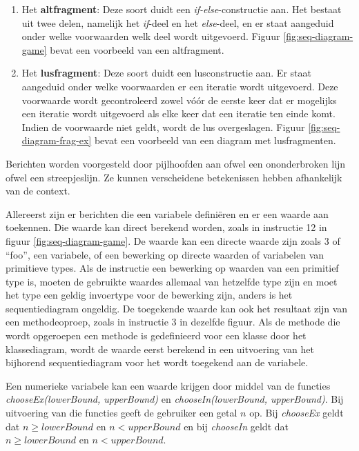 \begin{enumerate}
	\item Het \textbf{altfragment}: Deze soort duidt een \textit{if-else}-constructie aan. Het bestaat uit twee delen, namelijk het \textit{if}-deel en het \textit{else}-deel, en er staat aangeduid onder welke voorwaarden welk deel wordt uitgevoerd. Figuur \ref{fig:seq-diagram-game} bevat een voorbeeld van een altfragment.
	\item Het \textbf{lusfragment}: Deze soort duidt een lusconstructie aan. Er staat aangeduid onder welke voorwaarden er een iteratie wordt uitgevoerd. Deze voorwaarde wordt gecontroleerd zowel v\'o\'or de eerste keer dat er mogelijks een iteratie wordt uitgevoerd als elke keer dat een iteratie ten einde komt. Indien de voorwaarde niet geldt, wordt de lus overgeslagen. Figuur \ref{fig:seq-diagram-frag-ex} bevat een voorbeeld van een diagram met lusfragmenten.
\end{enumerate}

Berichten worden voorgesteld door pijlhoofden aan ofwel een ononderbroken lijn ofwel een streepjeslijn. Ze kunnen verscheidene betekenissen hebben afhankelijk van de context.

Allereerst zijn er berichten die een variabele defini\"eren en er een waarde aan toekennen. Die waarde kan direct berekend worden, zoals in instructie 12 in figuur \ref{fig:seq-diagram-game}. De waarde kan een directe waarde zijn zoals 3 of ``foo'', een variabele, of een bewerking op directe waarden of variabelen van primitieve types. Als de instructie een bewerking op waarden van een primitief type is, moeten de gebruikte waardes allemaal van hetzelfde type zijn en moet het type een geldig invoertype voor de bewerking zijn, anders is het sequentiediagram ongeldig. De toegekende waarde kan ook het resultaat zijn van een methodeoproep, zoals in instructie 3 in dezelfde figuur. Als de methode die wordt opgeroepen een methode is gedefinieerd voor een klasse door het klassediagram, wordt de waarde eerst berekend in een uitvoering van het bijhorend sequentiediagram voor het wordt toegekend aan de variabele.

Een numerieke variabele kan een waarde krijgen door middel van de functies \textit{chooseEx(lowerBound, upperBound)} en \textit{chooseIn(lowerBound, upperBound)}. Bij uitvoering van die functies geeft de gebruiker een getal $n$ op. Bij \textit{chooseEx} geldt dat $n \geq lowerBound$ en $n < upperBound$ en bij \textit{chooseIn} geldt dat $n \geq lowerBound$ en $n < upperBound$.


